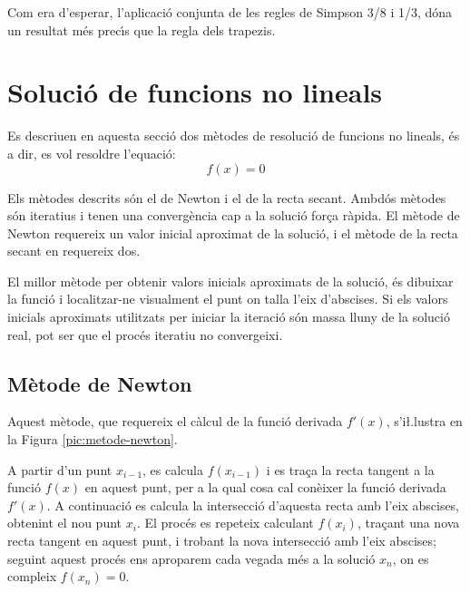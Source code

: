 \begin{exemple}
    Com era d'esperar, l'aplicaci\'{o} conjunta de les regles de Simpson 3/8 i 1/3, d\'{o}na un resultat m\'{e}s prec\'{\i}s que la regla dels trapezis.
\end{exemple}


\section{Soluci\'{o} de funcions no lineals}\label{sec:func-no-lin}

Es descriuen en aquesta secci\'{o} dos m\`{e}todes de resoluci\'{o} de funcions no lineals, \'{e}s a dir, es vol resoldre l'equaci\'{o}: \begin{equation}
   f(x) = 0 \end{equation}

Els m\`{e}todes descrits s\'{o}n el de Newton i el de la recta secant. Ambd\'{o}s m\`{e}todes s\'{o}n iteratius i tenen una converg\`{e}ncia cap a la soluci\'{o} for\c{c}a r\`{a}pida. El m\`{e}tode de Newton requereix un valor inicial aproximat de la soluci\'{o}, i el m\`{e}tode de la recta secant en requereix dos.

El millor m\`{e}tode per obtenir valors inicials aproximats de la soluci\'{o}, \'{e}s dibuixar la funci\'{o} i localitzar-ne visualment el punt on talla l'eix d'abscises. Si els valors inicials aproximats utilitzats per iniciar la iteraci\'{o} s\'{o}n massa lluny de la soluci\'{o} real, pot ser que el proc\'{e}s iteratiu no convergeixi.


\subsection{M\`{e}tode de Newton}

Aquest m\`{e}tode, que requereix el c\`{a}lcul de la funci\'{o} derivada $f'(x)$, s'i{\l.l}ustra en la Figura \vref{pic:metode-newton}.

\begin{center}
    
    \label{pic:metode-newton}
\end{center}


A partir d'un punt $x_{i-1}$, es calcula $f(x_{i-1})$ i es tra\c{c}a la recta tangent a la funci\'{o} $f(x)$ en aquest punt, per a la qual cosa cal con\`{e}ixer la funci\'{o} derivada $f'(x)$. A continuaci\'{o} es calcula la intersecci\'{o} d'aquesta recta amb l'eix abscises, obtenint el nou punt $x_i$. El proc\'{e}s es repeteix calculant $f(x_i)$, tra\c{c}ant una nova recta tangent en aquest punt, i trobant la nova intersecci\'{o} amb l'eix abscises; seguint aquest proc\'{e}s ens aproparem cada vegada m\'{e}s a la soluci\'{o} $x_n$, on es compleix $f(x_n)=0$.


